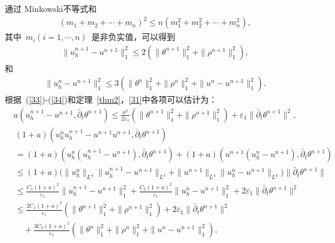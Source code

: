 \documentclass[twoside,UTF8]{nputhesis}
\begin{document}
通过 Minkowski不等式和
\begin{equation*}
\begin{split}
(m_1+m_2+\cdots+m_n)^2\leq n(m_1^2+m_2^2+\cdots+m_n^2),
\label{32}
\end{split}
\end{equation*}
其中~$m_i(i=1,\cdots,n)$~是非负实值，可以得到
\begin{equation}
\begin{split}
\| u^{n+1}_h-u^{n+1}\|^2_1\leq2(\|\theta^{n+1}\|^2_1+\| \rho^{n+1}\|^2_1),
\label{33}
\end{split}
\end{equation}
和
\begin{equation}
\begin{split}
\| u^n_h-u^{n+1}\|^2_1\leq3(\|\theta^{n}\|^2_1+\| \rho^{n}\|^2_1+\| u^n-u^{n+1}\|^2_1).
\label{34}
\end{split}
\end{equation}
根据~(\ref{33})-(\ref{34})和定理~\ref{thm2}，\eqref{31}中各项可以估计为：
\begin{equation}
\begin{split}
a(u^{n+1}_h-u^{n+1},\bar{\partial}_t\theta^{n+1} )
\leq\frac{a^2}{2\varepsilon_1}(\| \theta^{n+1}\|^2_1+\| \rho^{n+1}\|^2_1)+\varepsilon_1\| \bar{\partial}_t\theta^{n+1} \|^2,
\label{37}
\end{split}
\end{equation}
\begin{equation}
\begin{split}
&(1+a)\left(u^n_hu^{n+1}_h-u^{n+1}u^{n+1},\bar{\partial}_t\theta^{n+1} \right)\\
&=(1+a)\left(u^n_h(u^{n+1}_h-u^{n+1}),\bar{\partial}_t\theta^{n+1}  \right)+(1+a)\left(u^{n+1}(u^n_h-u^{n+1}), \bar{\partial}_t\theta^{n+1} \right)\\
&\leq(1+a)\Big(\| u^n_h\|_{L^4}\| u^{n+1}_h-u^{n+1}\|_{L^4}+\| u^{n+1}\|_{L^4}\| u^n_h-u^{n+1}\|_{L^4}\Big)\| \bar{\partial}_t\theta^{n+1} \|\\
&\leq\frac{C_1(1+a)^2}{\varepsilon_1}\| u^{n+1}_h-u^{n+1}\|^2_1+\frac{C_2(1+a)^2}{\varepsilon_1}\| u^{n}_h-u^{n+1}\|^2_1+2\varepsilon_1\| \bar{\partial}_t\theta^{n+1} \|^2\\
&\leq \frac{2C_1(1+a)^2}{\varepsilon_1}(\| \theta^{n+1}\|^2_1+\| \rho^{n+1}\|^2_1)+2\varepsilon_1\| \bar{\partial}_t\theta^{n+1} \|^2\\
&\quad+\frac{3C_2(1+a)^2}{\varepsilon_1}(\| \theta^n\|^2_1+\| \rho^n\|^2_1+\| u^n-u^{n+1}\|^2_1),
\label{36}
\end{split}
\end{equation}
\end{document}
